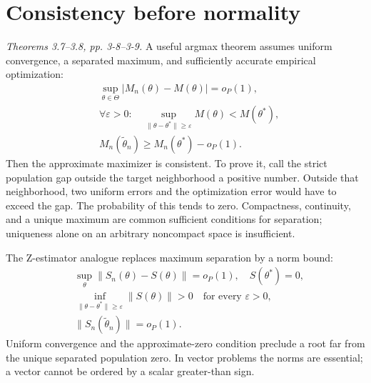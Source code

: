 \documentclass[12pt]{article}
\begin{document}
\section{Consistency before normality}
\textit{Theorems 3.7--3.8, pp. 3-8--3-9.}
A useful argmax theorem assumes uniform convergence, a separated maximum,
and sufficiently accurate empirical optimization:
\begin{align}
 &\sup_{\theta\in\Theta}|M_n(\theta)-M(\theta)|=o_P(1),\\
 &\forall\varepsilon>0:\quad
 \sup_{\|\theta-\theta^*\|\ge\varepsilon}M(\theta)<M(\theta^*),\\
 &M_n(\widetilde\theta_n)\ge M_n(\theta^*)-o_P(1).
\end{align}
Then the approximate maximizer is consistent. To prove it, call the
strict population gap outside the target neighborhood a positive number.
Outside that neighborhood, two uniform errors and the optimization error
would have to exceed the gap. The probability of this tends to zero.
Compactness, continuity, and a unique maximum are common sufficient
conditions for separation; uniqueness alone on an arbitrary noncompact
space is insufficient.

The Z-estimator analogue replaces maximum separation by a norm bound:
\begin{align}
 &\sup_\theta\|S_n(\theta)-S(\theta)\|=o_P(1),\quad S(\theta^*)=0,\\
 &\inf_{\|\theta-\theta^*\|\ge\varepsilon}\|S(\theta)\|>0
 \quad\text{for every }\varepsilon>0,\\
 &\|S_n(\widetilde\theta_n)\|=o_P(1).
\end{align}
Uniform convergence and the approximate-zero condition preclude a root
far from the unique separated population zero. In vector problems the
norms are essential; a vector cannot be ordered by a scalar greater-than sign.
\end{document}
